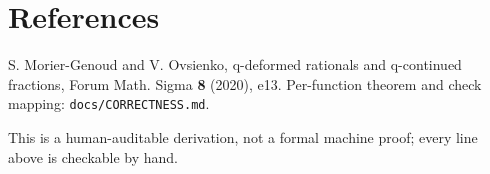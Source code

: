 \documentclass[11pt]{article}
\begin{document}
\section*{References}
S. Morier-Genoud and V. Ovsienko, q-deformed rationals and q-continued
fractions, Forum Math. Sigma \textbf{8} (2020), e13. Per-function theorem and
check mapping: \texttt{docs/CORRECTNESS.md}.

\medskip
\noindent This is a human-auditable derivation, not a formal machine proof;
every line above is checkable by hand.
\end{document}
